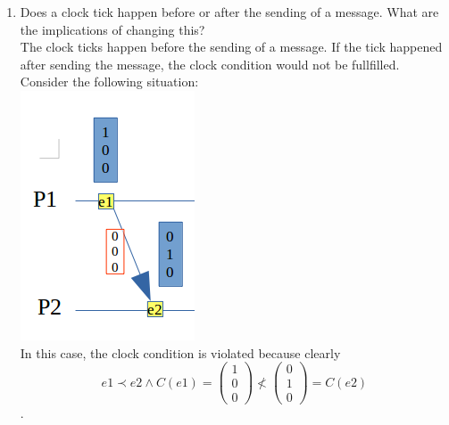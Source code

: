 \documentclass[11pt]{article}
\begin{document}
\begin{enumerate}
\item {Does a clock tick happen before or after the sending of a message. What are the implications
of changing this?} \vspace{4pt}\\ 
The clock ticks happen before the sending of a message. If the tick happened after sending the message, the clock condition would not be fullfilled. Consider the following situation: \\
\includegraphics[scale=0.4]{question3_example}\\
In this case, the clock condition is violated because clearly $$e1 \prec e2 \wedge C(e1) = \begin{pmatrix} 1 \\ 0 \\ 0 \end{pmatrix} \not< \begin{pmatrix} 0 \\ 1 \\ 0 \end{pmatrix} = C(e2)$$.
 

\end{enumerate}
\end{document}

